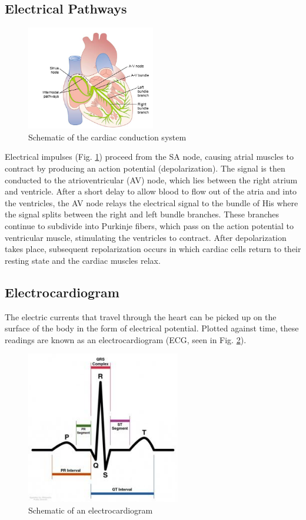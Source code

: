 \documentclass{article}
\begin{document}
\subsection*{Electrical Pathways}
\begin{figure}[h]
\centering\includegraphics[width=0.5\textwidth]{../images/ECG_I_1.jpg}
\caption{Schematic of the cardiac conduction system}
\label{pathways}
\end{figure}
Electrical impulses (Fig. \ref{pathways}) proceed from the SA node, causing atrial muscles to contract by producing an action potential (depolarization). The signal is then conducted to the atrioventricular (AV) node, which lies between the right atrium and ventricle. After a short delay to allow blood to flow out of the atria and into the ventricles, the AV node relays the electrical signal to the bundle of His where the signal splits between the right and left bundle branches. These branches continue to subdivide into Purkinje fibers, which pass on the action potential to ventricular muscle, stimulating the ventricles to contract. After depolarization takes place, subsequent repolarization occurs in which cardiac cells return to their resting state and the cardiac muscles relax.

\subsection*{Electrocardiogram}
The electric currents that travel through the heart can be picked up on the surface of the body in the form of electrical potential. Plotted against time, these readings are known as an electrocardiogram (ECG, seen in Fig. \ref{ecg}).\\

\begin{figure}[h]
\centering\includegraphics[width=0.6\textwidth]{../images/ECG_I_2.jpg}
\caption{Schematic of an electrocardiogram}
\label{ecg}
\end{figure}
\end{document}
